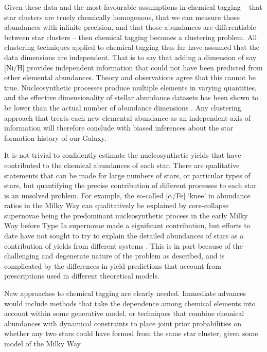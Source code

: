 \documentclass[twocolumn]{aastex62}
\begin{document}
Given these data and the most favourable assumptions in chemical tagging 
-- that star clusters are truely chemically homogenous, that we can measure 
those abundances with infinite precision, and that those abundances are 
differentiable between star clusters -- then chemical
tagging becomes a clustering problem. All clustering techniques applied to 
chemical tagging thus far have assumed that the data dimensions are independent. That is to say
that adding a dimension of say [Ni/H] provides independent information
that could not have been predicted from other elemental abundances.
Theory and observations agree that this cannot be true.
Nucleosynthetic processes produce multiple elements in varying
quantities, and the effective dimensionality of stellar abundance datasets has been shown
to be lower than the actual number of abundance dimensions \citep{Ting:2012,Price-Jones:2018}.
Any clustering approach that treats each new elemental abundance as an 
independent axis of information will therefore conclude with biased inferences
about the star formation history of our Galaxy. 


It is not trivial to confidently estimate
the nucleosynthetic yields that have contributed to the chemical abundances of each star. There are
qualitative statements that can be made for large numbers of stars, or particular
types of stars, but quantifying the precise contribution of different processes
to each star is an unsolved problem. For example, the so-called [$\alpha$/Fe] `knee' in
abundance ratios in the Milky Way can qualitatively be explained by 
core-collapse supernovae being the predominant nucleosynthetic process in the
early Milky Way before Type Ia supernovae made a significant contribution, but 
efforts to date have not sought to try to explain the detailed abundances of 
stars as a contribution of yields from different systems \citep[however see][]{West:2013}.
This is in part 
because of the challenging and degenerate nature of the problem as described, 
and is complicated by the differences in yield predictions that account from 
prescriptions used in different theoretical models.


New approaches to chemical tagging are clearly needed. Immediate advances would
include methods that take the dependence among chemical elements into account
within some generative model, or techniques that combine chemical abundances
with dynamical constraints to place joint prior probabilities on whether any
two stars could have formed from the same star cluster, given some model of the
Milky Way. 
\end{document}
